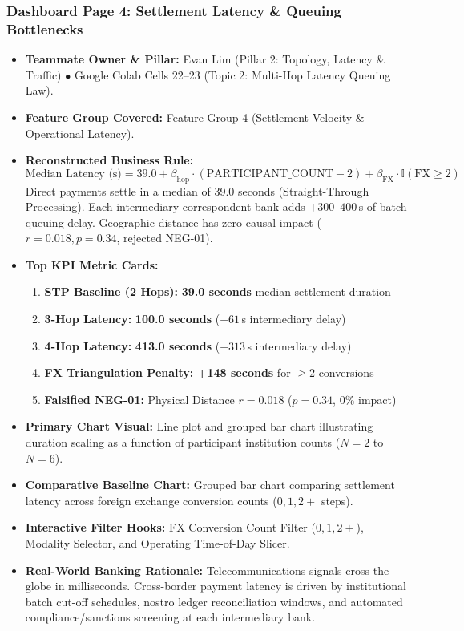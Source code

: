 \documentclass[11pt,a4paper]{article}
\begin{document}
\subsubsection{Dashboard Page 4: Settlement Latency \& Queuing Bottlenecks}
\begin{itemize}
    \item \textbf{Teammate Owner \& Pillar:} Evan Lim (Pillar 2: Topology, Latency \& Traffic) $\bullet$ Google Colab Cells 22--23 (Topic 2: Multi-Hop Latency Queuing Law).
    \item \textbf{Feature Group Covered:} Feature Group 4 (Settlement Velocity \& Operational Latency).
    \item \textbf{Reconstructed Business Rule:}
    \begin{equation}
    \text{Median Latency (s)} = 39.0 + \beta_{\text{hop}} \cdot (\text{PARTICIPANT\_COUNT} - 2) + \beta_{\text{FX}} \cdot \mathbb{I}(\text{FX} \ge 2)
    \end{equation}
    Direct payments settle in a median of 39.0 seconds (Straight-Through Processing). Each intermediary correspondent bank adds $+300\text{--}400$\,s of batch queuing delay. Geographic distance has zero causal impact ($r=0.018, p=0.34$, rejected NEG-01).
    \item \textbf{Top KPI Metric Cards:}
    \begin{enumerate}
        \item \textbf{STP Baseline (2 Hops):} \textbf{39.0 seconds} median settlement duration
        \item \textbf{3-Hop Latency:} \textbf{100.0 seconds} ($+61$\,s intermediary delay)
        \item \textbf{4-Hop Latency:} \textbf{413.0 seconds} ($+313$\,s intermediary delay)
        \item \textbf{FX Triangulation Penalty:} \textbf{+148 seconds} for $\ge 2$ conversions
        \item \textbf{Falsified NEG-01:} Physical Distance $r = 0.018$ ($p = 0.34$, 0\% impact)
    \end{enumerate}
    \item \textbf{Primary Chart Visual:} Line plot and grouped bar chart illustrating duration scaling as a function of participant institution counts ($N=2$ to $N=6$).
    \item \textbf{Comparative Baseline Chart:} Grouped bar chart comparing settlement latency across foreign exchange conversion counts ($0, 1, 2+$ steps).
    \item \textbf{Interactive Filter Hooks:} FX Conversion Count Filter ($0, 1, 2+$), Modality Selector, and Operating Time-of-Day Slicer.
    \item \textbf{Real-World Banking Rationale:} Telecommunications signals cross the globe in milliseconds. Cross-border payment latency is driven by institutional batch cut-off schedules, nostro ledger reconciliation windows, and automated compliance/sanctions screening at each intermediary bank.
\end{itemize}
\end{document}
